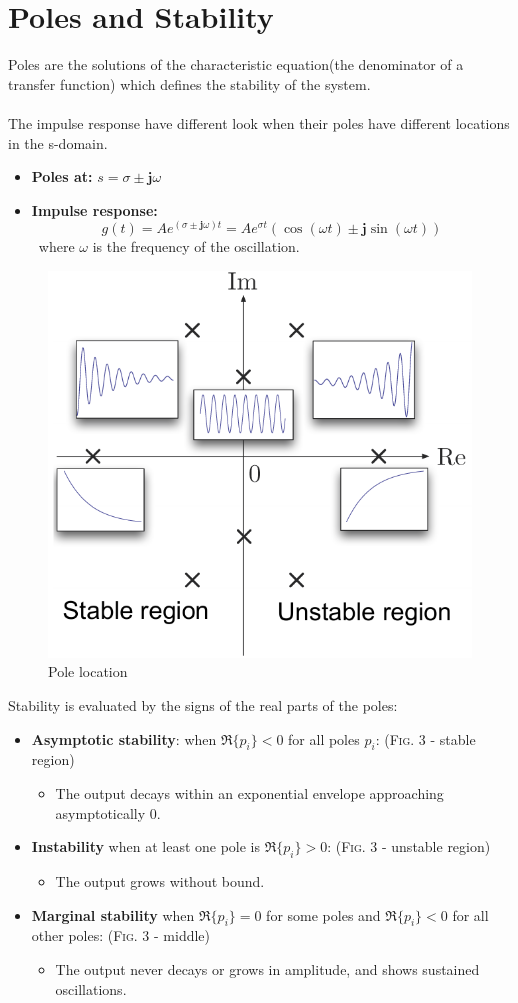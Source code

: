 \documentclass[12pt,a4paper]{article}
\begin{document}
\section{Poles and Stability}
Poles are the solutions of the characteristic equation(the denominator of a transfer function) which defines the stability of the system.\\\\
The impulse response have different look when their poles have different locations in the s-domain.
\begin{itemize}
\item \textbf{Poles at:} $s = \sigma \pm \mathbf{j}\omega$
\item \textbf{Impulse response:}
\[ g(t) = Ae^{(\sigma \pm \mathbf{j}\omega)t} = Ae^{\sigma t}(\cos(\omega t)\pm\mathbf{j}\sin(\omega t))\]
\ where $\omega$ is the frequency of the oscillation.
\end{itemize}
\begin{figure}[H] \centering
\includegraphics[width=.45\textwidth]{images/pole_location.pdf}
\caption{Pole location}
\end{figure}
Stability is evaluated by the signs of the real parts of the poles:
\begin{itemize}
\item \textbf{Asymptotic stability}: when $\Re\{p_{i}\} < 0 $ for all poles $p_{i}$: (\textsc{Fig. 3} - stable region)
\begin{itemize}
\item The output decays within an exponential envelope approaching asymptotically 0. 
\end{itemize}
\item \textbf{Instability} when at least one pole is $\Re\{p_{i}\} >0$: (\textsc{Fig. 3} - unstable region)
\begin{itemize}
\item The output grows without bound. 
\end{itemize}
\item \textbf{Marginal stability} when $\Re\{p_{i}\} =0$ for some poles and $\Re\{p_{i}\} <0$ for all other poles: (\textsc{Fig. 3} - middle)
\begin{itemize}
\item The output never decays or grows in amplitude, and shows sustained oscillations. 
\end{itemize}
\end{itemize}
\end{document}
